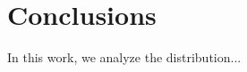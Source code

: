 \documentclass[prb,twocolumn,9pt]{revtex4-1}
\begin{document}
    


\section{Conclusions}
\label{sec:conclusions}

In this work, we analyze the distribution...




{}
\end{document}

